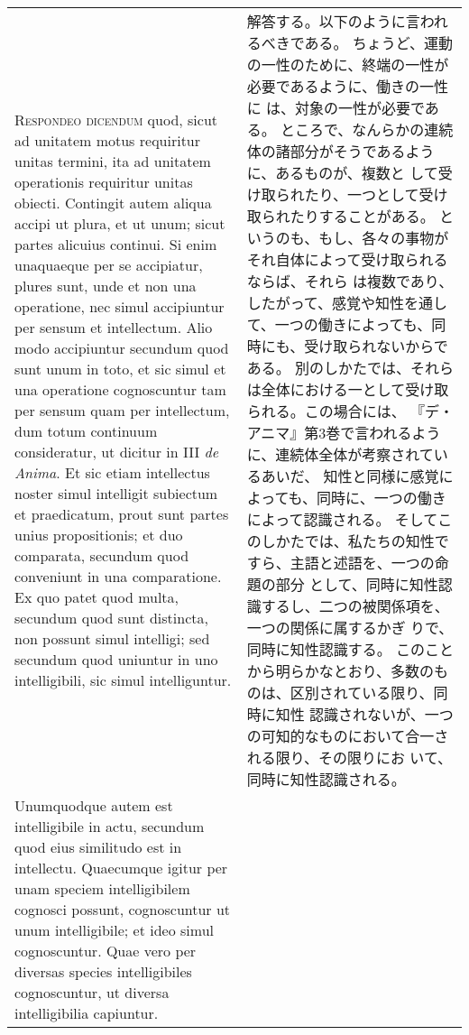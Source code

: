 \documentclass[10pt]{jsarticle} %
\begin{document}
\begin{longtable}{p{21em}p{21em}}
{\scshape Respondeo dicendum} quod, sicut ad unitatem
motus requiritur unitas termini, ita ad unitatem operationis requiritur
unitas obiecti. Contingit autem aliqua accipi ut plura, et ut unum;
sicut partes alicuius continui. Si enim unaquaeque per se accipiatur,
plures sunt, unde et non una operatione, nec simul accipiuntur per
sensum et intellectum. Alio modo accipiuntur secundum quod sunt unum in
toto, et sic simul et una operatione cognoscuntur tam per sensum quam
per intellectum, dum totum continuum consideratur, ut dicitur in III {\itshape de
Anima}. Et sic etiam intellectus noster simul intelligit subiectum et
praedicatum, prout sunt partes unius propositionis; et duo comparata,
secundum quod conveniunt in una comparatione. 
Ex quo patet quod multa,
secundum quod sunt distincta, non possunt simul intelligi; sed secundum
quod uniuntur in uno intelligibili, sic simul intelliguntur. 


&

解答する。以下のように言われるべきである。
ちょうど、運動の一性のために、終端の一性が必要であるように、働きの一性に
 は、対象の一性が必要である。
ところで、なんらかの連続体の諸部分がそうであるように、あるものが、複数と
 して受け取られたり、一つとして受け取られたりすることがある。
というのも、もし、各々の事物がそれ自体によって受け取られるならば、それら
 は複数であり、したがって、感覚や知性を通して、一つの働きによっても、同
 時にも、受け取られないからである。
別のしかたでは、それらは全体における一として受け取られる。この場合には、
 『デ・アニマ』第3巻で言われるように、連続体全体が考察されているあいだ、
 知性と同様に感覚によっても、同時に、一つの働きによって認識される。
そしてこのしかたでは、私たちの知性ですら、主語と述語を、一つの命題の部分
 として、同時に知性認識するし、二つの被関係項を、一つの関係に属するかぎ
 りで、同時に知性認識する。
このことから明らかなとおり、多数のものは、区別されている限り、同時に知性
 認識されないが、一つの可知的なものにおいて合一される限り、その限りにお
 いて、同時に知性認識される。


\\



Unumquodque
autem est intelligibile in actu, secundum quod eius similitudo est in
intellectu. Quaecumque igitur per unam speciem intelligibilem cognosci
possunt, cognoscuntur ut unum intelligibile; et ideo simul
cognoscuntur. Quae vero per diversas species intelligibiles
cognoscuntur, ut diversa intelligibilia capiuntur. 



&


\end{longtable}
\end{document}
